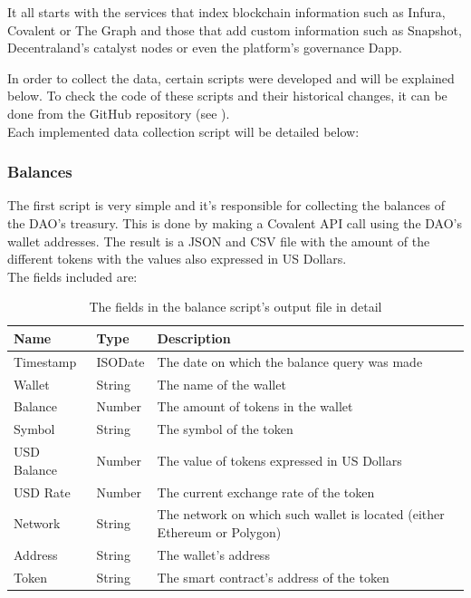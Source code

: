 \documentclass[MSE,Master,english]{twbook}%
\begin{document}
It all starts with the services that index blockchain information such as Infura, Covalent or The Graph and those that add custom information such as Snapshot, Decentraland's catalyst nodes or even the platform's governance Dapp.

In order to collect the data, certain scripts were developed and will be explained below. To check the code of these scripts and their historical changes, it can be done from the GitHub repository (see \cite{transparencyRepo}). \\

Each implemented data collection script will be detailed below:
\subsubsection{Balances}
The first script is very simple and it's responsible for collecting the balances of the DAO's treasury. This is done by making a Covalent API call using the DAO's wallet addresses. The result is a JSON and CSV file with the amount of the different tokens with the values also expressed in US Dollars. \\

The fields included are:
\begin{table}[H]
  \centering
  \begin{tabularx}{\textwidth}{|l|l|X|}
  \hline
  \textbf{Name} & \textbf{Type} & \textbf{Description}                         \\ \hline
  Timestamp     & ISODate       & The date on which the balance query was made \\ \hline
  Wallet        & String        & The name of the wallet                       \\ \hline
  Balance       & Number        & The amount of tokens in the wallet           \\ \hline
  Symbol        & String        & The symbol of the token                      \\ \hline
  USD Balance   & Number        & The value of tokens expressed in US Dollars  \\ \hline
  USD Rate      & Number        & The current exchange rate of the token       \\ \hline
  Network & String & The network on which such wallet is located (either Ethereum or Polygon) \\ \hline
  Address       & String        & The wallet's address                         \\ \hline
  Token         & String        & The smart contract's address of the token    \\ \hline
  \end{tabularx}
  \caption{The fields in the balance script's output file in detail}
  \label{table:balace}
\end{table}
\end{document}
